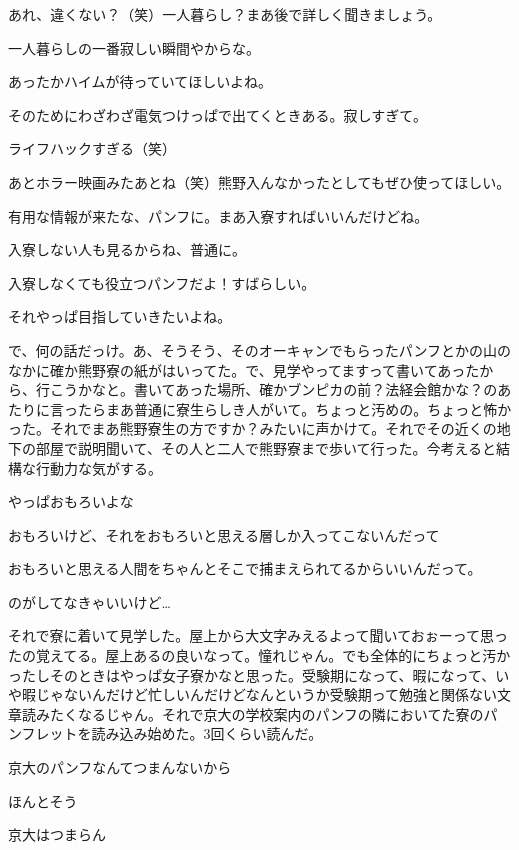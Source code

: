 \begin{multicols}{2}
  あれ、違くない？（笑）一人暮らし？まあ後で詳しく聞きましょう。

  一人暮らしの一番寂しい瞬間やからな。

  あったかハイムが待っていてほしいよね。

  そのためにわざわざ電気つけっぱで出てくときある。寂しすぎて。

  ライフハックすぎる（笑）

  あとホラー映画みたあとね（笑）熊野入んなかったとしてもぜひ使ってほしい。

  有用な情報が来たな、パンフに。まあ入寮すればいいんだけどね。

  入寮しない人も見るからね、普通に。

  入寮しなくても役立つパンフだよ！すばらしい。

  それやっぱ目指していきたいよね。

  で、何の話だっけ。あ、そうそう、そのオーキャンでもらったパンフとかの山のなかに確か熊野寮の紙がはいってた。で、見学やってますって書いてあったから、行こうかなと。書いてあった場所、確かブンピカの前？法経会館かな？のあたりに言ったらまあ普通に寮生らしき人がいて。ちょっと汚めの。ちょっと怖かった。それでまあ熊野寮生の方ですか？みたいに声かけて。それでその近くの地下の部屋で説明聞いて、その人と二人で熊野寮まで歩いて行った。今考えると結構な行動力な気がする。

  やっぱおもろいよな

  おもろいけど、それをおもろいと思える層しか入ってこないんだって

  おもろいと思える人間をちゃんとそこで捕まえられてるからいいんだって。

  のがしてなきゃいいけど…

  それで寮に着いて見学した。屋上から大文字みえるよって聞いておぉーって思ったの覚えてる。屋上あるの良いなって。憧れじゃん。でも全体的にちょっと汚かったしそのときはやっぱ女子寮かなと思った。受験期になって、暇になって、いや暇じゃないんだけど忙しいんだけどなんというか受験期って勉強と関係ない文章読みたくなるじゃん。それで京大の学校案内のパンフの隣においてた寮のパンフレットを読み込み始めた。3回くらい読んだ。

  京大のパンフなんてつまんないから

  ほんとそう

  京大はつまらん


\end{multicols}
